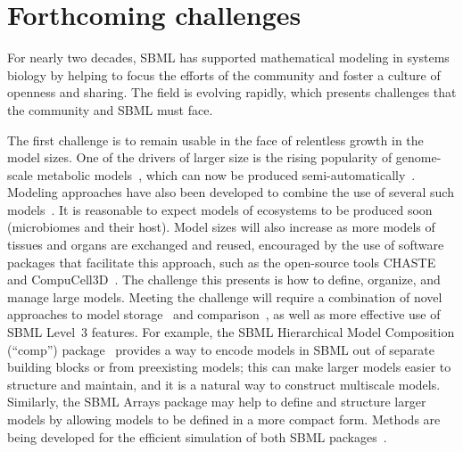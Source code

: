 \documentclass{sbml-paper}
\begin{document}
\hrulefill
\newpage

\section*{Forthcoming challenges}

For nearly two decades, SBML has supported mathematical modeling in systems biology by helping to focus the efforts of the community and foster a culture of openness and sharing.  The field is evolving rapidly, which presents challenges that the community and SBML must face.

The first challenge is to remain usable in the face of relentless growth in the model sizes.  One of the drivers of larger size is the rising popularity of genome-scale metabolic models~\citep{Bordbar2014a}, which can now be produced semi-automatically~\citep{henry2010high, buchel2013path2models, Magnusdottir2017}.  Modeling approaches have also been developed to combine the use of several such models~\citep[e.g.,][]{bordbar2011multi}.  It is reasonable to expect models of ecosystems to be produced soon (\eg microbiomes and their host).  Model sizes will also increase as more models of tissues and organs are exchanged and reused, encouraged by the use of software packages that facilitate this approach, such as the open-source tools CHASTE~\citep{mirams2013chaste} and CompuCell3D~\citep{swat2012multi}.  The challenge this presents is how to define, organize, and manage large models.  Meeting the challenge will require a combination of novel approaches to model storage~\citep[e.g.,][]{Henkel2015combininga} and comparison~\citep[e.g.,][]{Scharm2016algorithm, Scharm2016comodi}, as well as more effective use of SBML Level~3 features.  For example, the SBML Hierarchical Model Composition (``comp'') package~\citep{Smith2015} provides a way to encode models in SBML out of separate building blocks or from preexisting models; this can make larger models easier to structure and maintain, and it is a natural way to construct multiscale models.  Similarly, the SBML Arrays package may help to define and structure larger models by allowing models to be defined in a more compact form.  Methods are being developed for the efficient simulation of both SBML packages~\citep{watanabe2014hierarchical, watanabe2016efficient}.
\end{document}
